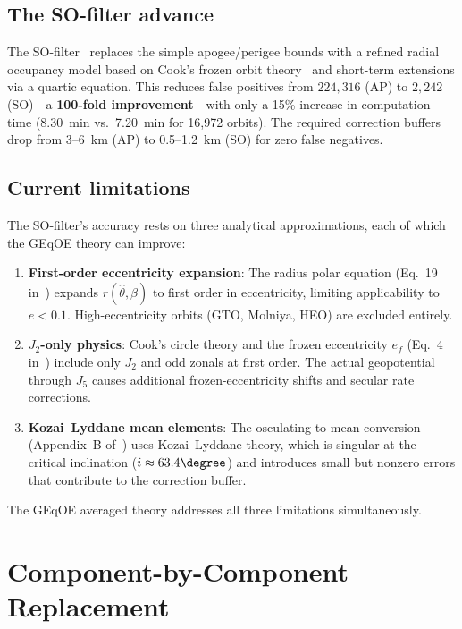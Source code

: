 \documentclass[11pt]{article}
\begin{document}
\subsection{The SO-filter advance}

The SO-filter~\cite{rivero2025} replaces the simple apogee/perigee bounds
with a refined radial occupancy model based on Cook's frozen orbit
theory~\cite{cook1966} and short-term extensions via a quartic equation. This
reduces false positives from $224{,}316$ (AP) to $2{,}242$ (SO)---a
\textbf{100-fold improvement}---with only a 15\% increase in computation time
(8.30~min vs.\ 7.20~min for 16,972 orbits). The required correction buffers
drop from 3--6~km (AP) to 0.5--1.2~km (SO) for zero false negatives.

\subsection{Current limitations}

The SO-filter's accuracy rests on three analytical approximations, each of
which the GEqOE theory can improve:
\begin{enumerate}
\item \textbf{First-order eccentricity expansion}: The radius polar equation
(Eq.~19 in~\cite{rivero2025}) expands $r(\hat\theta, \beta)$ to first order
in eccentricity, limiting applicability to $e < 0.1$. High-eccentricity
orbits (GTO, Molniya, HEO) are excluded entirely.
\item \textbf{$J_2$-only physics}: Cook's circle theory and the frozen
eccentricity $e_f$ (Eq.~4 in~\cite{rivero2025}) include only $J_2$ and odd
zonals at first order. The actual geopotential through $J_5$ causes additional
frozen-eccentricity shifts and secular rate corrections.
\item \textbf{Kozai--Lyddane mean elements}: The osculating-to-mean
conversion (Appendix~B of~\cite{rivero2025}) uses Kozai--Lyddane theory, which
is singular at the critical inclination ($i \approx 63.4\degree$) and
introduces small but nonzero errors that contribute to the correction buffer.
\end{enumerate}

The GEqOE averaged theory addresses all three limitations simultaneously.

\section{Component-by-Component Replacement}
\label{sec:components}
\end{document}
